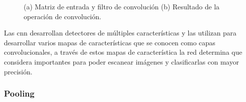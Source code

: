 \begin{figure}[htbp]
\centering
{}%

\caption{(a) Matriz de entrada y filtro de convolución (b) Resultado de la operación de convolución.}\label{Fig:filter}
\end{figure}


Las \ac{cnn} desarrollan detectores de múltiples características y las utilizan para desarrollar varios mapas de características que se conocen como capas convolucionales, a través de estos mapas de característica la red determina que  considera importantes para poder escanear imágenes y clasificarlas con mayor precisión.
\subsubsection{Pooling}\label{sub:pooling}

